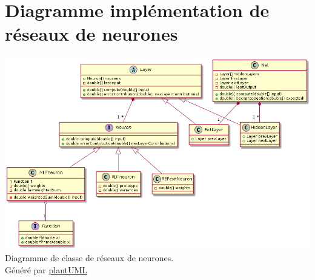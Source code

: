 \documentclass[12pt,a4paper,oneside, titlepage]{article}
\begin{document}
\section{Diagramme implémentation de réseaux de neurones}\label{uml}
\includegraphics[width=\textwidth]{../../uml/neurondiag.png}
Diagramme de classe de réseaux de neurones.\\Généré par \href{http://plantuml.com/class-diagram}{plantUML}
\end{document}
